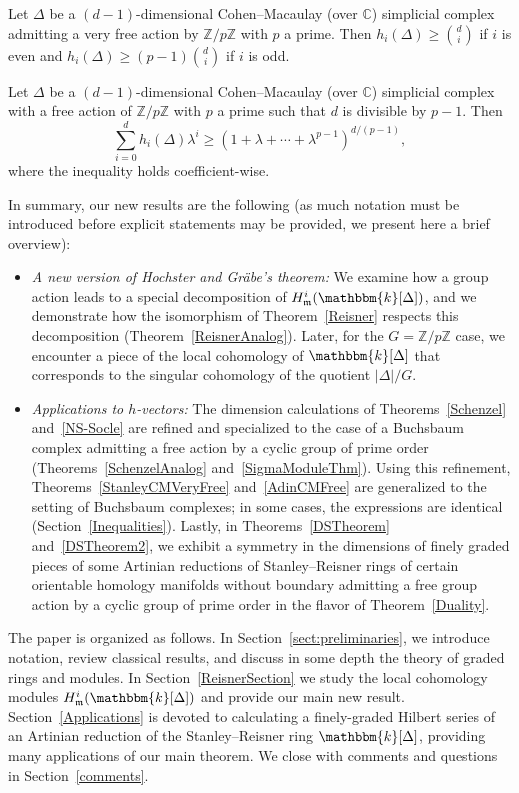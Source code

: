 \documentclass[ALCO,ThmDefs,Unicode]{cedram}
\newcommand{\field}{\mathbbm{k}}
\newcommand{\CC}{{\mathbb C}}
\newcommand{\ZZ}{{\mathbb Z}}
\newcommand{\mideal}{\ensuremath{\mathfrak{m}}}
\begin{document}
\begin{theo}[Stanley]\label{StanleyCMVeryFree}
Let $\Delta$ be a $(d-1)$-dimensional Cohen--Macaulay (over $\CC$) simplicial complex admitting a very free action by $\ZZ/p\ZZ$ with $p$ a prime. Then $ h_i(\Delta)\ge \binom{d}{i}$ if $i$ is even and $h_i(\Delta)\ge (p-1)\binom{d}{i}$ if $i$ is odd.
\end{theo}

\begin{theo}[Adin]\label{AdinCMFree}
Let $\Delta$ be a $(d-1)$-dimensional Cohen--Macaulay (over $\CC$) simplicial complex with a free action of $\ZZ/p\ZZ$ with $p$ a prime such that $d$ is divisible by $p-1$. Then
\[
\sum_{i=0}^dh_i(\Delta)\lambda^i\ge (1+\lambda+\cdots +\lambda^{p-1})^{d/(p-1)},
\]
where the inequality holds coefficient-wise.
\end{theo}

In summary, our new results are the following (as much notation must be introduced before explicit statements may be provided, we present here a brief overview):
\begin{itemize}
\item \emph{A new version of Hochster and Gr\"abe's theorem:} We examine how a group action leads to a special decomposition of $H_\mideal^i(\field[\Delta])$, and we demonstrate how the isomorphism of Theorem~\ref{Reisner} respects this decomposition (Theorem~\ref{ReisnerAnalog}). Later, for the $G=\ZZ/p\ZZ$ case, we encounter a piece of the local cohomology of $\field[\Delta]$ that corresponds to the singular cohomology of the quotient $|\Delta|/G$.
\item \emph{Applications to $h$-vectors:} The dimension calculations of Theorems~\ref{Schenzel} and~\ref{NS-Socle} are refined and specialized to the case of a Buchsbaum complex admitting a free action by a cyclic group of prime order (Theorems~\ref{SchenzelAnalog} and~\ref{SigmaModuleThm}). Using this refinement, Theorems~\ref{StanleyCMVeryFree} and~\ref{AdinCMFree} are generalized to the setting of Buchsbaum complexes; in some cases, the expressions are identical (Section~\ref{Inequalities}). Lastly, in Theorems~\ref{DSTheorem} and~\ref{DSTheorem2}, we exhibit a symmetry in the dimensions of finely graded pieces of some Artinian reductions of Stanley--Reisner rings of certain orientable homology manifolds without boundary admitting a free group action by a cyclic group of prime order in the flavor of Theorem~\ref{Duality}.
\end{itemize}
The paper is organized as follows. In Section~\ref{sect:preliminaries}, we introduce notation, review classical results, and discuss in some depth the theory of graded rings and modules. In Section~\ref{ReisnerSection} we study the local cohomology modules $H_\mideal^i(\field[\Delta])$ and provide our main new result. Section~\ref{Applications} is devoted to calculating a finely-graded Hilbert series of an Artinian reduction of the Stanley--Reisner ring $\field[\Delta]$, providing many applications of our main theorem. We close with comments and questions in Section~\ref{comments}.
\end{document}
